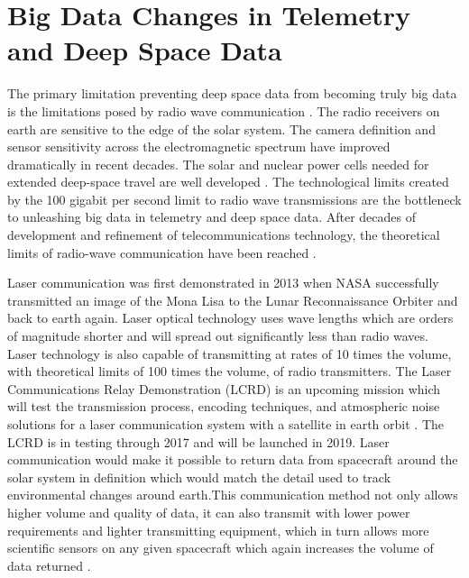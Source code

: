 \documentclass[sigconf]{acmart}
\begin{document}
\section{Big Data Changes in Telemetry and Deep Space Data}
The primary limitation preventing deep space data from becoming truly big data is the limitations posed by radio wave communication \cite{Cola2011}. The radio receivers on earth are sensitive to the edge of the solar system. The camera definition and sensor sensitivity across the electromagnetic spectrum have improved dramatically in recent decades. The solar and nuclear power cells needed for extended deep-space travel are well developed \cite{Port2016}. The technological limits created by the 100 gigabit per second limit to radio wave transmissions are the bottleneck to unleashing big data in telemetry and deep space data. After decades of development and refinement of telecommunications technology, the theoretical limits of radio-wave communication have been reached \cite{Bricker1990}.


Laser communication was first demonstrated in 2013 when NASA successfully transmitted an image of the Mona Lisa \cite{Pages2013} to the Lunar Reconnaissance Orbiter \cite{Hsu2010} and back to earth again. Laser optical technology uses wave lengths which are orders of magnitude shorter and will spread out significantly less than radio waves. Laser technology is also capable of transmitting at rates of 10 times the volume, with theoretical limits of 100 times the volume, of radio transmitters. The Laser Communications Relay Demonstration (LCRD) is an upcoming mission which will test the transmission process, encoding techniques, and atmospheric noise solutions for a laser communication system with a satellite in earth orbit \cite{JoshuaBuck2013}. The LCRD is in testing through 2017 and will be launched in 2019. Laser communication would make it possible to return data from spacecraft around the solar system in definition which would match the detail used to track environmental changes around earth.This communication method not only allows higher volume and quality of data, it can also transmit with lower power requirements and lighter transmitting equipment, which in turn allows more scientific sensors on any given spacecraft which again increases the volume of data returned \cite{Cola2011,JoshuaBuck2013}. 
\end{document}
